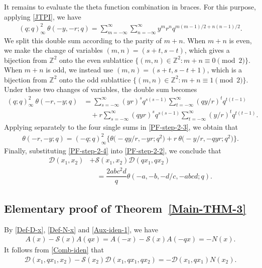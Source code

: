 \documentclass[12pt,reqno]{amsart}
\numberwithin{equation}{section}
\theoremstyle{plain}
\theoremstyle{definition}
\begin{document}
It remains to evaluate the theta function combination in braces. For this purpose,
applying \eqref{JTPI}, we have
\begin{align*}
(q;q)_\infty^2\!\:\theta(-y,-r;q)=\sum_{m=-\infty}^\infty\sum_{n=-\infty}^\infty y^{m}
r^{n}q^{m(m-1)/2+n(n-1)/2}.
\end{align*}
We split this double sum according to the parity of $m+n$. When $m+n$ is even, we make
the change of variables $(m,n)=(s+t,s-t)$, which gives a bijection from $\mathbb{Z}^2$ onto the even sublattice $\{(m,n)\in\mathbb{Z}^2\colon m+n\equiv0\pmod{2}\}$. When
$m+n$ is odd, we instead use $(m,n)=(s+t,s-t+1)$, which is a bijection from $\mathbb{Z}^2$ onto the odd sublattice
$\{(m,n)\in\mathbb{Z}^2\colon m+n\equiv1\pmod{2}\}$. Under these two changes of
variables, the double sum becomes
\begin{align}
(q;q)_\infty^2\!\:\theta(-r,-y;q) &=\sum_{s=-\infty}^\infty(yr)^sq^{s(s-1)}
\sum_{t=-\infty}^\infty(qy/r)^tq^{t(t-1)}\nonumber\\
 &\quad+r\sum_{s=-\infty}^\infty(qyr)^sq^{s(s-1)}\sum_{t=-\infty}^\infty(y/r)^t
q^{t(t-1)}.\label{PF-step-2-3}
\end{align}
Applying separately to the four single sums in \eqref{PF-step-2-3}, we obtain that
\begin{align}
\theta(-r,-y;q)=(-q;q)_\infty^2\big\{\theta\big({-}qy/r,-yr;q^2\big)
+r\!\:\theta\big({-}y/r,-qyr;q^2\big)\big\}.\label{PF-step-2-4}
\end{align}
Finally, substituting \eqref{PF-step-2-4} into \eqref{PF-step-2-2}, we conclude that
\begin{align*}
\mathscr{D}(x_1,x_2) &+\mathscr{S}(x_1,x_2)\mathscr{D}(qx_1,qx_2)\\
 &\quad=\dfrac{2abc^2d}{q}\theta(-a,-b,-d/c,-abcd;q).
\end{align*}


\subsection{Elementary proof of Theorem~\ref{Main-THM-3}}
By \eqref{Def-D-x}, \eqref{Def-N-x} and \eqref{Aux-iden-1}, we have
\begin{align}
A(x)-\mathscr{S}(x)A(qx)=A(-x)-\mathscr{S}(x)A(-qx)=-N(x).\label{Comb-iden}
\end{align}
It follows from \eqref{Comb-iden} that
\begin{align}
\mathscr{D}(x_1,qx_1,x_2)-\mathscr{S}(x_2)\mathscr{D}(x_1,qx_1,qx_2)
=-\mathscr{D}(x_1,qx_1)N(x_2).\label{PF-step-3-1}
\end{align}
\end{document}
